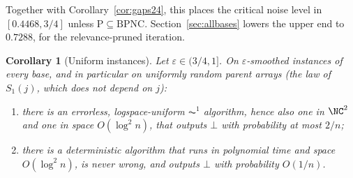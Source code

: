 \documentclass[11pt]{amsart}
\newtheorem{corollary}[theorem]{Corollary}
\theoremstyle{definition}
\theoremstyle{remark}
\newcommand{\eps}{\varepsilon}
\begin{document}
\noindent Together with Corollary~\ref{cor:gaps24}, this places the critical noise level in
$[0.4468,3/4]$ unless $\mathrm P\subseteq\mathrm{BPNC}$. Section~\ref{sec:allbases} lowers the upper
end to $0.7288$, for the relevance-pruned iteration.

\begin{corollary}[Uniform instances]\label{kp:cor316}
Let $\eps\in(3/4,1]$. On $\eps$-smoothed instances of every base, and in
particular on uniformly random parent arrays (the law of $S_1(j)$, which
does not depend on $j$):
\begin{enumerate}[label=\textup{(\alph*)},leftmargin=2em]
\item there is an errorless, logspace-uniform $\AC^1$ algorithm, hence also
  one in $\NC^2$ and one in space $O(\log^2 n)$, that outputs $\bot$ with
  probability at most $2/n$;
\item there is a deterministic algorithm that runs in polynomial time and space
  $O(\log^2 n)$, is never wrong, and outputs $\bot$ with probability $O(1/n)$.
\end{enumerate}
\end{corollary}
\end{document}
